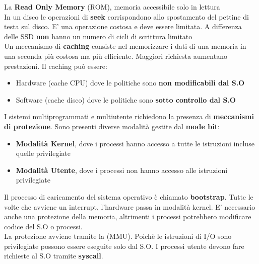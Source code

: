 \documentclass{article}
\begin{document}
La \textbf{Read Only Memory} (ROM), memoria accessibile solo in lettura\\
In un disco le operazioni di \textbf{seek} corrispondono allo spostamento del pettine di testa sul disco. E' una operazione costosa e deve essere limitata. A differenza delle SSD \textbf{non} hanno un numero di cicli di scrittura limitato\\
Un meccanismo di \textbf{caching} consiste nel memorizzare  i dati di una memoria in una seconda più costosa ma più efficiente. Maggiori richiesta aumentano prestazioni. Il caching può essere:
\begin{itemize}
  \item Hardware (cache CPU) dove le politiche sono \textbf{non modificabili dal S.O}
  \item Software (cache disco) dove le politiche sono \textbf{sotto controllo dal S.O}
\end{itemize}

I sistemi multiprogrammati e multiutente richiedono la presenza di \textbf{meccanismi di protezione}. Sono presenti diverse modalità gestite dal \textbf{mode bit}:
\begin{itemize}
  \item \textbf{Modalità Kernel}, dove i processi hanno accesso a tutte le istruzioni incluse quelle privilegiate
  \item \textbf{Modalità Utente}, dove i processi non hanno accesso alle istruzioni privilegiate
\end{itemize}
Il processo di caricamento del sistema operativo è chiamato \textbf{bootstrap}. Tutte le volte che avviene un interrupt, l'hardware passa in modalità kernel. E' necessario anche una protezione della memoria, altrimenti i processi potrebbero modificare codice del S.O o processi.\\
La protezione avviene tramite la  (MMU). Poichè le istruzioni di I/O sono privilegiate possono essere eseguite solo dal S.O. I processi utente devono fare richieste al S.O tramite \textbf{syscall}.
\end{document}
